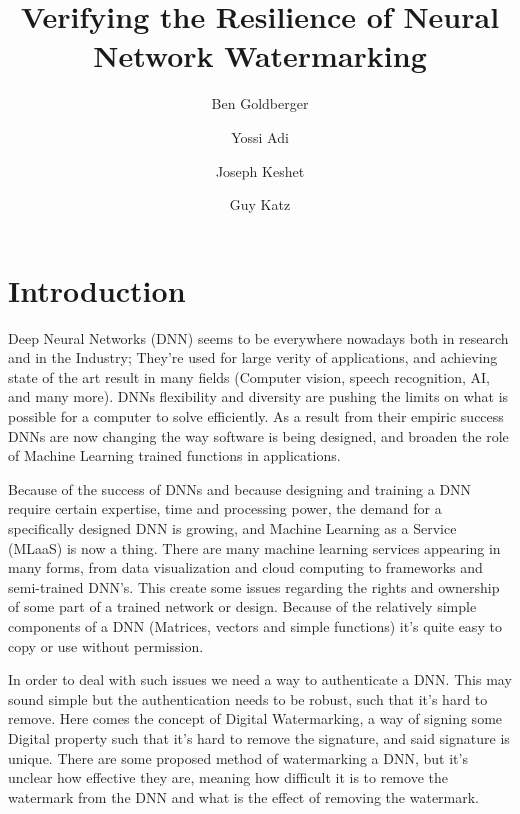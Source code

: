 \documentclass[a4paper]{easychair}
\begin{document}
\title{Verifying the Resilience of Neural Network Watermarking}

\author{
  Ben Goldberger \and
  Yossi Adi \and
  Joseph Keshet \and
  Guy Katz 
}


\maketitle

\section{Introduction}


Deep Neural Networks (DNN) seems to be everywhere nowadays both in research and in  the Industry; They're used for large verity of applications, and achieving state of the art result in many fields (Computer vision, speech recognition, AI, and many more). DNNs flexibility and diversity are pushing the limits on what is possible for a computer to solve efficiently. As a result from their empiric success DNNs are now changing the way software is being designed, and broaden the role of Machine Learning trained functions in applications.

Because of the success of DNNs and because designing and training a DNN require certain expertise, time and processing power, the demand for a specifically designed DNN is growing, and Machine Learning as a Service (MLaaS) is now a thing. There are many machine learning services appearing in many forms, from data visualization and cloud computing to frameworks and semi-trained DNN's. This create some issues regarding the rights and ownership of some part of a trained network or design. Because of the relatively simple components of a DNN (Matrices, vectors and simple functions) it's quite easy to copy or use without permission.

In order to deal with such issues we need a way to authenticate a DNN. This may sound simple but the authentication needs to be robust, such that it's hard to remove. Here comes the concept of Digital Watermarking, a way of signing some Digital property such that it's hard to remove the signature, and said signature is unique. There are some proposed method of watermarking a DNN, but it's unclear how effective they are, meaning how difficult it is to remove the watermark from the DNN and what is the effect of removing the watermark.
\end{document}
